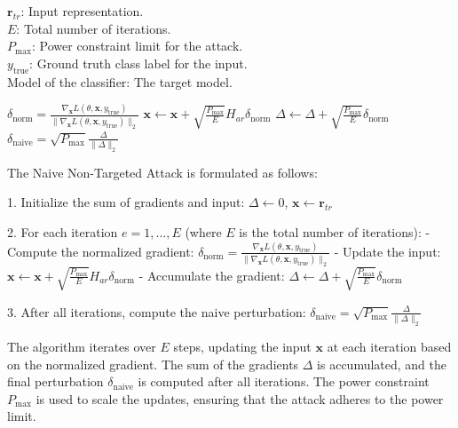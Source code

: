 
$\mathbf{r}_{tr}$: Input representation. \\
$E$: Total number of iterations. \\
$P_{\text{max}}$: Power constraint limit for the attack. \\
$y_{\text{true}}$: Ground truth class label for the input. \\
Model of the classifier: The target model.

$\delta_{\text{norm}} = \frac{\nabla_{\mathbf{x}} L(\theta, \mathbf{x}, y_{\text{true}})}{\|\nabla_{\mathbf{x}} L(\theta, \mathbf{x}, y_{\text{true}})\|_2}$
$\mathbf{x} \leftarrow \mathbf{x} + \sqrt{\frac{P_{\text{max}}}{E}} H_{ar} \delta_{\text{norm}}$
$\Delta \leftarrow \Delta + \sqrt{\frac{P_{\text{max}}}{E}} \delta_{\text{norm}}$
$\delta_{\text{naive}} = \sqrt{P_{\text{max}}} \frac{\Delta}{\|\Delta\|_2}$

The Naive Non-Targeted Attack is formulated as follows:

1. Initialize the sum of gradients and input:
   $ \Delta \leftarrow 0 $, $ \mathbf{x} \leftarrow \mathbf{r}_{tr} $

2. For each iteration $ e = 1, \ldots, E $ (where $ E $ is the total number of iterations):
   - Compute the normalized gradient:
     $ \delta_{\text{norm}} = \frac{\nabla_{\mathbf{x}} L(\theta, \mathbf{x}, y_{\text{true}})}{\|\nabla_{\mathbf{x}} L(\theta, \mathbf{x}, y_{\text{true}})\|_2} $
   - Update the input:
     $ \mathbf{x} \leftarrow \mathbf{x} + \sqrt{\frac{P_{\text{max}}}{E}} H_{ar} \delta_{\text{norm}} $
   - Accumulate the gradient:
     $ \Delta \leftarrow \Delta + \sqrt{\frac{P_{\text{max}}}{E}} \delta_{\text{norm}} $

3. After all iterations, compute the naive perturbation:
   $ \delta_{\text{naive}} = \sqrt{P_{\text{max}}} \frac{\Delta}{\|\Delta\|_2} $

The algorithm iterates over $E$ steps, updating the input $ \mathbf{x} $ at each iteration based on the normalized gradient. The sum of the gradients $\Delta$ is accumulated, and the final perturbation $\delta_{\text{naive}}$ is computed after all iterations. The power constraint $P_{\text{max}}$ is used to scale the updates, ensuring that the attack adheres to the power limit.